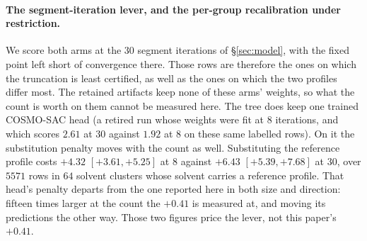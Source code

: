 \paragraph{The segment-iteration lever, and the per-group recalibration under restriction.}
We score both arms at the $30$ segment iterations of \S\ref{sec:model}, with the fixed point
left short of convergence there. Those rows are therefore the ones on which the truncation is
least certified, as well as the ones on which the two profiles differ most.
The retained artifacts keep none of these arms' weights, so what the count is worth on them
cannot be measured here. The tree does keep one trained COSMO-SAC head (a retired run whose weights
were fit at $8$ iterations, and which scores $2.61$ at $30$ against $1.92$ at $8$ on these same
labelled rows). On it the substitution penalty moves with the count as well. Substituting the reference profile
costs $+4.32$ $[+3.61,+5.25]$ at $8$ against $+6.43$ $[+5.39,+7.68]$ at $30$, over $5571$ rows in
$64$ solvent clusters whose solvent carries a reference profile. That head's penalty departs from
the one reported here in both size and direction: fifteen times larger at the count the $+0.41$ is
measured at, and moving its predictions the other way. Those two figures price the lever, not this
paper's $+0.41$.

